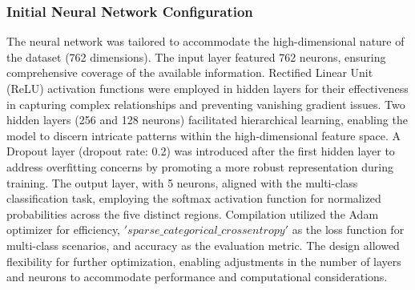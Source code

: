 \documentclass[conference]{IEEEtran}
\begin{document}
\subsubsection{Initial Neural Network Configuration}
The neural network was tailored to accommodate the high-dimensional nature of the dataset (762 dimensions). The input layer featured 762 neurons, ensuring comprehensive coverage of the available information.
Rectified Linear Unit (ReLU) activation functions were employed in hidden layers for their effectiveness in capturing complex relationships and preventing vanishing gradient issues.
Two hidden layers (256 and 128 neurons) facilitated hierarchical learning, enabling the model to discern intricate patterns within the high-dimensional feature space.
A Dropout layer (dropout rate: 0.2) was introduced after the first hidden layer to address overfitting concerns by promoting a more robust representation during training.
The output layer, with 5 neurons, aligned with the multi-class classification task, employing the softmax activation function for normalized probabilities across the five distinct regions.
Compilation utilized the Adam optimizer for efficiency, $'sparse\_categorical\_crossentropy'$ as the loss function for multi-class scenarios, and accuracy as the evaluation metric.
The design allowed flexibility for further optimization, enabling adjustments in the number of layers and neurons to accommodate performance and computational considerations.
\end{document}
